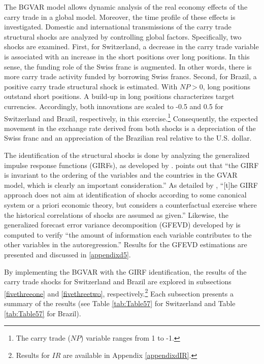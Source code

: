 \documentclass[a4paper, twoside]{templates/ociamthesis}
\begin{document}
The BGVAR model allows dynamic analysis of the real economy effects of the carry trade in a global model. Moreover, the time profile of these effects is investigated. Domestic and international transmissions of the carry trade structural shocks are analyzed by controlling global factors. Specifically, two shocks are examined. First, for Switzerland, a decrease in the carry trade variable is associated with an increase in the short positions over long positions. In this sense, the funding role of the Swiss franc is augmented. In other words, there is more carry trade activity funded by borrowing Swiss francs. Second, for Brazil, a positive carry trade structural shock is estimated. With \(NP>0\), long positions outstand short positions. A build-up in long positions characterizes target currencies. Accordingly, both innovations are scaled to -0.5 and 0.5 for Switzerland and Brazil, respectively, in this exercise.\footnote{The carry trade (\(NP\)) variable ranges from 1 to -1.} Consequently, the expected movement in the exchange rate derived from both shocks is a depreciation of the Swiss franc and an appreciation of the Brazilian real relative to the U.S. dollar.

The identification of the structural shocks is done by analyzing the generalized impulse response functions (GIRFs), as developed by \textcite{pesaran1998}. \textcite[ 21]{dees2007} points out that ``the GIRF is invariant to the ordering of the variables and the countries in the GVAR model, which is clearly an important consideration.'' As detailed by \textcite[ 176]{chudik2016}, ``{[}t{]}he GIRF approach does not aim at identification of shocks according to some canonical system or a priori economic theory, but considers a counterfactual exercise where the historical correlations of shocks are assumed as given.'' Likewise, the generalized forecast error variance decomposition (GFEVD) developed by \textcite{lanne2016} is computed to verify ``the amount of information each variable contributes to the other variables in the autoregression.'' \autocite[ 16]{bock2020} Results for the GFEVD estimations are presented and discussed in \ref{appendixd5}.

By implementing the BGVAR with the GIRF identification, the results of the carry trade shocks for Switzerland and Brazil are explored in subsections \ref{fivethreeone} and \ref{fivethreetwo}, respectively.\footnote{Results for \(IR\) are available in Appendix \ref{appendixdIR}.} Each subsection presents a summary of the results (see Table \ref{tab:Table57} for Switzerland and Table \ref{tab:Table57} for Brazil).
\end{document}
